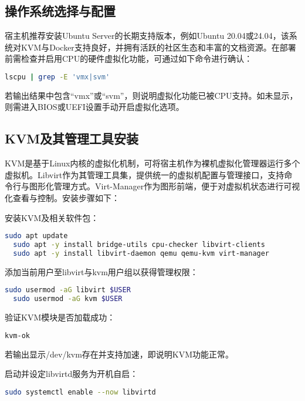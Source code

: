 \documentclass[lang=cn,10pt]{elegantbook}
\begin{document}
\subsection{操作系统选择与配置}

宿主机推荐安装Ubuntu Server的长期支持版本，例如Ubuntu 20.04或24.04，该系统对KVM与Docker支持良好，并拥有活跃的社区生态和丰富的文档资源。在部署前需检查并启用CPU的硬件虚拟化功能，可通过如下命令进行确认：


\begin{lstlisting}[language=bash]
  lscpu | grep -E 'vmx|svm'
\end{lstlisting}

若输出结果中包含“vmx”或“svm”，则说明虚拟化功能已被CPU支持。如未显示，则需进入BIOS或UEFI设置手动开启虚拟化选项。

\subsection{KVM及其管理工具安装}

KVM是基于Linux内核的虚拟化机制，可将宿主机作为裸机虚拟化管理器运行多个虚拟机。Libvirt作为其管理工具集，提供统一的虚拟机配置与管理接口，支持命令行与图形化管理方式。Virt-Manager作为图形前端，便于对虚拟机状态进行可视化查看与控制。安装步骤如下：

安装KVM及相关软件包：

\begin{lstlisting}[language=bash]
  sudo apt update
  sudo apt -y install bridge-utils cpu-checker libvirt-clients 
  sudo apt -y install libvirt-daemon qemu qemu-kvm virt-manager
\end{lstlisting}

添加当前用户至libvirt与kvm用户组以获得管理权限：

\begin{lstlisting}[language=bash]
  sudo usermod -aG libvirt $USER
  sudo usermod -aG kvm $USER
\end{lstlisting}

验证KVM模块是否加载成功：

\begin{lstlisting}[language=bash]
  kvm-ok
\end{lstlisting}

若输出显示/dev/kvm存在并支持加速，即说明KVM功能正常。

启动并设定libvirtd服务为开机自启：

\begin{lstlisting}[language=bash]
  sudo systemctl enable --now libvirtd
\end{lstlisting}
\end{document}

